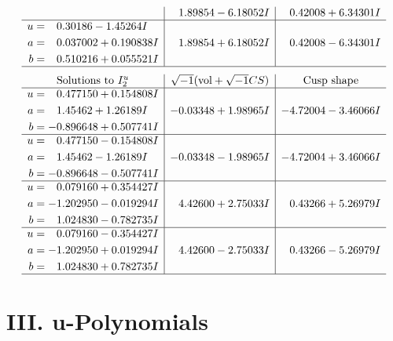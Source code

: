 \documentclass[1p]{elsarticle_modified}
\theoremstyle{definition}
\newcommand{\I}{\sqrt{-1}}
\begin{document}
$$\begin{array}{c|c|c}
 & \phantom{-}1.89854 - 6.18052 I & \phantom{-}0.42008 + 6.34301 I \\ \hline\begin{aligned}
u &= \phantom{-}0.30186 - 1.45264 I \\
a &= \phantom{-}0.037002 + 0.190838 I \\
b &= \phantom{-}0.510216 + 0.055521 I\end{aligned}
 & \phantom{-}1.89854 + 6.18052 I & \phantom{-}0.42008 - 6.34301 I\\
 \hline 
 \end{array}$$\newpage$$\begin{array}{c|c|c}  
\text{Solutions to }I^u_{2}& \I (\text{vol} + \sqrt{-1}CS) & \text{Cusp shape}\\
 \hline 
\begin{aligned}
u &= \phantom{-}0.477150 + 0.154808 I \\
a &= \phantom{-}1.45462 + 1.26189 I \\
b &= -0.896648 + 0.507741 I\end{aligned}
 & -0.03348 + 1.98965 I & -4.72004 - 3.46066 I \\ \hline\begin{aligned}
u &= \phantom{-}0.477150 - 0.154808 I \\
a &= \phantom{-}1.45462 - 1.26189 I \\
b &= -0.896648 - 0.507741 I\end{aligned}
 & -0.03348 - 1.98965 I & -4.72004 + 3.46066 I \\ \hline\begin{aligned}
u &= \phantom{-}0.079160 + 0.354427 I \\
a &= -1.202950 - 0.019294 I \\
b &= \phantom{-}1.024830 - 0.782735 I\end{aligned}
 & \phantom{-}4.42600 + 2.75033 I & \phantom{-}0.43266 + 5.26979 I \\ \hline\begin{aligned}
u &= \phantom{-}0.079160 - 0.354427 I \\
a &= -1.202950 + 0.019294 I \\
b &= \phantom{-}1.024830 + 0.782735 I\end{aligned}
 & \phantom{-}4.42600 - 2.75033 I & \phantom{-}0.43266 - 5.26979 I\\
 \hline 
 \end{array}$$\newpage
\newpage\renewcommand{\arraystretch}{1}
\centering \section*{ III. u-Polynomials}
\end{document}
